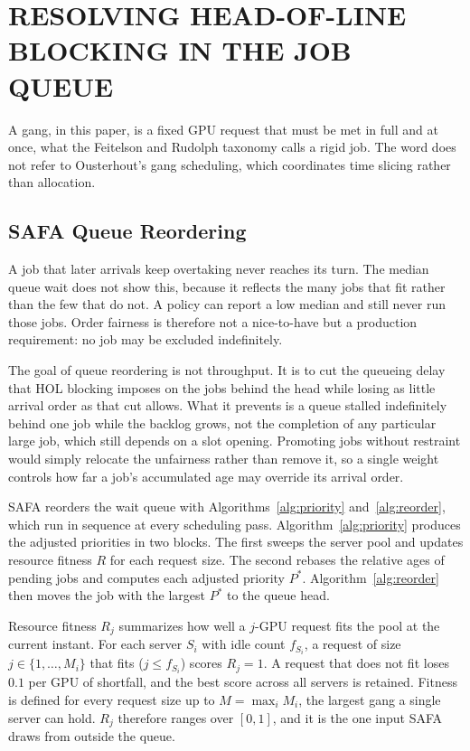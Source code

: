 \documentclass{ieeetj}
\begin{document}
\section{RESOLVING HEAD-OF-LINE BLOCKING IN THE JOB QUEUE}\label{algo:intro}
A gang, in this paper, is a fixed GPU request that must be met in full and at once, what the Feitelson and Rudolph taxonomy\cite{feitelson1996toward} calls a rigid job. The word does not refer to Ousterhout's gang scheduling\cite{ousterhout1982gang}, which coordinates time slicing rather than allocation.

\subsection{SAFA Queue Reordering}
A job that later arrivals keep overtaking never reaches its turn. The median queue wait does not show this, because it reflects the many jobs that fit rather than the few that do not. A policy can report a low median and still never run those jobs. Order fairness is therefore not a nice-to-have but a production requirement: no job may be excluded indefinitely.

The goal of queue reordering is not throughput. It is to cut the queueing delay that HOL blocking imposes on the jobs behind the head while losing as little arrival order as that cut allows. What it prevents is a queue stalled indefinitely behind one job while the backlog grows, not the completion of any particular large job, which still depends on a slot opening. Promoting jobs without restraint would simply relocate the unfairness rather than remove it, so a single weight controls how far a job's accumulated age may override its arrival order.

SAFA reorders the wait queue with Algorithms~\ref{alg:priority} and~\ref{alg:reorder}, which run in sequence at every scheduling pass. Algorithm~\ref{alg:priority} produces the adjusted priorities in two blocks. The first sweeps the server pool and updates resource fitness $R$ for each request size. The second rebases the relative ages of pending jobs and computes each adjusted priority $P^*$. Algorithm~\ref{alg:reorder} then moves the job with the largest $P^*$ to the queue head.

Resource fitness $R_j$ summarizes how well a $j$-GPU request fits the pool at the current instant. For each server $S_i$ with idle count $f_{S_i}$, a request of size $j\in\{1,\dots,M_i\}$ that fits ($j\le f_{S_i}$) scores $R_j=1$. A request that does not fit loses $0.1$ per GPU of shortfall, and the best score across all servers is retained. Fitness is defined for every request size up to $M=\max_i M_i$, the largest gang a single server can hold. $R_j$ therefore ranges over $[0,1]$, and it is the one input SAFA draws from outside the queue.
\end{document}
